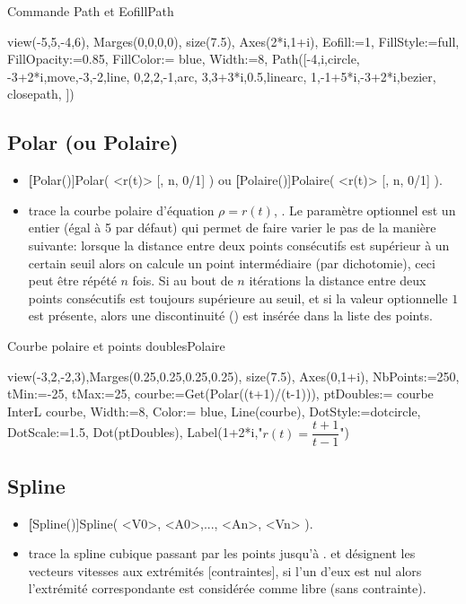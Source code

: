 \begin{demo}{Commande Path et Eofill}{Path}
\begin{texgraph}[name=Path]
view(-5,5,-4,6), Marges(0,0,0,0), size(7.5),
Axes(2*i,1+i), 
Eofill:=1, FillStyle:=full, FillOpacity:=0.85,
FillColor:= blue, Width:=8,
Path([-4,i,circle,
   -3+2*i,move,-3,-2,line,
   0,2,2,-1,arc,
   3,3+3*i,0.5,linearc,
   1,-1+5*i,-3+2*i,bezier,
   closepath,
   ]) 
\end{texgraph}
\end{demo}

\subsection{Polar (ou Polaire)}\label{cmdPolaire}
\begin{itemize}
 \item \util \textbf[Polar()]{Polar( <r(t)> [, n, 0/1] )} ou \textbf[Polaire()]{Polaire( <r(t)> [, n, 0/1] )}.
 \item \desc trace la courbe polaire d'équation $\rho=r(t)$, . Le paramètre optionnel  est un entier (égal à 5 par défaut) qui permet de faire varier le pas de la manière suivante: lorsque la distance entre deux points consécutifs est supérieur à un certain seuil alors on calcule un point intermédiaire (par dichotomie), ceci peut être répété $n$ fois. Si au bout de $n$ itérations la distance entre deux points consécutifs est toujours supérieure au seuil, et si la valeur optionnelle $1$ est présente, alors une discontinuité (\jump) est insérée dans la liste des points.
\end{itemize}

\begin{demo}{Courbe polaire et points doubles}{Polaire}
\begin{texgraph}[name=Polaire]
view(-3,2,-2,3),Marges(0.25,0.25,0.25,0.25), size(7.5),
Axes(0,1+i), NbPoints:=250, tMin:=-25, tMax:=25,
courbe:=Get(Polar((t+1)/(t-1))),
ptDoubles:= courbe InterL courbe,
Width:=8, Color:= blue, Line(courbe),
DotStyle:=dotcircle, DotScale:=1.5, Dot(ptDoubles),
Label(1+2*i,"$r(t)=\dfrac{t+1}{t-1}$")
\end{texgraph}
\end{demo}

\subsection{Spline}\label{cmdSpline}
\begin{itemize}
 \item \util \textbf[Spline()]{Spline( <V0>, <A0>,..., <An>, <Vn> )}.
 \item \desc trace la spline cubique passant par les points  jusqu'à .  et  désignent les vecteurs vitesses aux extrémités [contraintes], si l'un d'eux est nul alors l'extrémité correspondante est considérée comme libre (sans contrainte).
\end{itemize}

